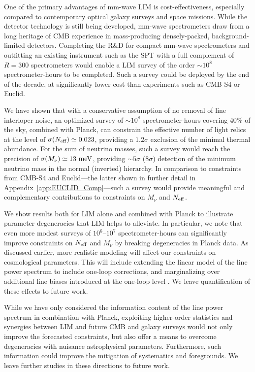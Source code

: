 \documentclass[twocolumn]{aastex631}
\begin{document}
One of the primary advantages of mm-wave LIM is cost-effectiveness, especially compared to contemporary optical galaxy surveys and space missions. While the detector technology is still being developed, mm-wave spectrometers draw from a long heritage of CMB experience in mass-producing densely-packed, background-limited detectors. Completing the R\&D for compact mm-wave spectrometers and outfitting an existing instrument such as the SPT with a full complement of $R=300$ spectrometers would enable a LIM survey of the order $\sim 10^8$ spectrometer-hours to be completed. Such a survey could be deployed by the end of the decade, at significantly lower cost than experiments such as CMB-S4 or Euclid.

We have shown that with a conservative assumption of no removal of line interloper noise, an optimized survey of $\sim 10^8$ spectrometer-hours covering 40\% of the sky, combined with Planck, can constrain the effective number of light relics at the level of  $\sigma(N_{\rm eff}) \simeq 0.023 $, providing a $1.2\sigma$ exclusion of the minimal thermal abundance. For the sum of neutrino masses, such a survey would reach the precision of $\sigma(M_\nu) \simeq 13 \ {\rm meV}$, providing $\sim5\sigma$ (8$\sigma$) detection of the minimum neutrino mass in the normal (inverted) hierarchy. In comparison to constraints from CMB-S4 and Euclid---the latter shown in further detail in Appendix~\ref{app:EUCLID_Comp}---such a survey would provide meaningful and complementary contributions to constraints on $M_{\nu}$ and $N_{\rm eff}$.

We show results both for LIM alone and combined with Planck to illustrate parameter degeneracies that LIM helps to alleviate. In particular, we note that even more modest surveys of $10^{6}$--$10^{7}$ spectrometer-hours can significantly improve constraints on $N_{\rm eff}$ and $M_{\nu}$ by breaking degeneracies in Planck data. As discussed earlier, more realistic modeling will affect our constraints on cosmological parameters. This will include extending the linear model of the line power spectrum to include one-loop corrections, and marginalizing over additional line biases introduced at the one-loop level \citep{Sailer:2021yzm}. We leave quantification of these effects to future work. 

While we have only considered the information content of the line power spectrum in combination with Planck, exploiting higher-order statistics and synergies between LIM and future CMB and galaxy surveys would not only improve the forecasted constraints, but also offer a means to overcome degeneracies with nuisance astrophysical parameters. Furthermore, such information could improve the mitigation of systematics and foregrounds. We leave further studies in these directions to future work. 
\end{document}
